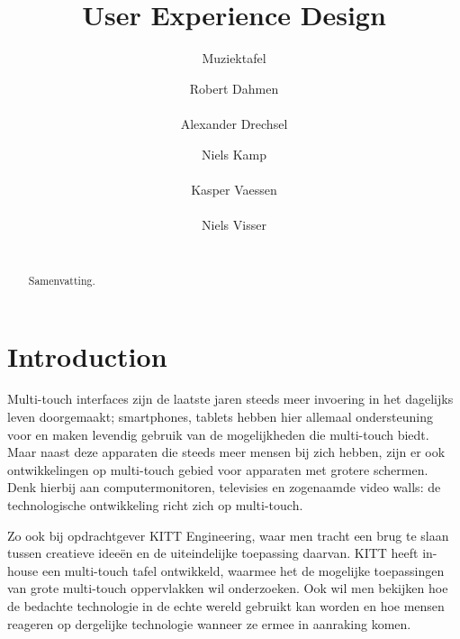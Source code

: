 \documentclass{acm}
\begin{document}
\title{User Experience Design}
\subtitle{Muziektafel}

\author{
\alignauthor Robert Dahmen\\
       \\
\alignauthor Alexander Drechsel
       \\
\and
\alignauthor Niels Kamp\\
       \\
\alignauthor Kasper Vaessen\\
       \\
\alignauthor Niels Visser\\
       \\
}
\maketitle

\begin{abstract}
Samenvatting.
\end{abstract}


\section{Introduction}
Multi-touch interfaces zijn de laatste jaren steeds meer invoering in het dagelijks leven doorgemaakt; smartphones, tablets hebben hier allemaal ondersteuning voor en maken levendig gebruik van de mogelijkheden die multi-touch biedt. Maar naast deze apparaten die steeds meer mensen bij zich hebben, zijn er ook ontwikkelingen op multi-touch gebied voor apparaten met grotere schermen. Denk hierbij aan computermonitoren, televisies en zogenaamde video walls: de technologische ontwikkeling richt zich op multi-touch.

Zo ook bij opdrachtgever KITT Engineering, waar men tracht een brug te slaan tussen creatieve idee\"en en de uiteindelijke toepassing daarvan. KITT heeft in-house een multi-touch tafel ontwikkeld, waarmee het de mogelijke toepassingen van grote multi-touch oppervlakken wil onderzoeken. Ook wil men bekijken hoe de bedachte technologie in de echte wereld gebruikt kan worden en hoe mensen reageren op dergelijke technologie wanneer ze ermee in aanraking komen.
\end{document}
